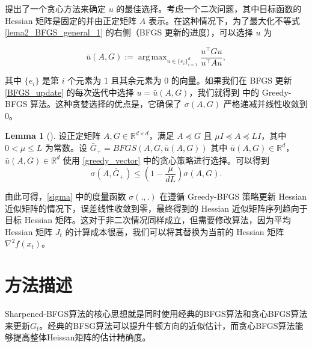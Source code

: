 \documentclass[a4paper,twoside,AutoFakeBold]{article}
\theoremstyle{definition}
\newtheorem{lema2}{{Lemma}}
\DeclareMathOperator*{\argmax}{arg\,max}
\begin{document}
\citet{rodomanov2020greedy} 提出了一个贪心方法来确定 $u$ 的最佳选择。考虑一个二次问题，其中目标函数的 Hessian 矩阵是固定的并由正定矩阵 $A$ 表示。在这种情况下，为了最大化不等式 \eqref{lema2_BFGS_general_1} 的右侧（BFGS 更新的进度），可以选择 $u$ 为

\begin{equation}\label{greedy_vector}
    \bar{u}(A, G) := \argmax_{u \in \{e_i\}_{i = 1}^{d}} \frac{u^\top G u}{u^\top A u},
\end{equation}

其中 $\{e_i\}$ 是第 $i$ 个元素为 $1$ 且其余元素为 $0$ 的向量。如果我们在 BFGS 更新 \eqref{BFGS_update} 的每次迭代中选择 $u = \bar{u}(A, G)$，我们就得到 \cite{rodomanov2020greedy} 中的 Greedy-BFGS 算法。这种贪婪选择的优点是，它确保了 $\sigma(A, G)$ 严格递减并线性收敛到 $0$。

\begin{lema2}[\cite{rodomanov2020greedy}]\label{lema2_BFGS_greedy}
    设正定矩阵 $A, G \in \mathbb{R}^{d \times d}$，满足 $A \preceq G$ 且 $ \mu I \preceq A \preceq LI$，其中 $0 < \mu \leq L$ 为常数。设 $\bar{G}_{+} = BFGS(A, G, \bar{u}(A, G))$ 其中 $\bar{u}(A, G) \in \mathbb{R}^d$，$\bar{u}(A, G) \in \mathbb{R}^d$ 使用 \eqref{greedy_vector} 中的贪心策略进行选择。可以得到
    \begin{equation}\label{lema2_BFGS_greedy_1}
        \sigma(A, \bar{G}_{+}) \leq \left(1 - \frac{\mu}{dL}\right)\sigma(A, G).
    \end{equation}
\end{lema2}

由此可得，\eqref{sigma} 中的度量函数 $\sigma(.,.)$ 在遵循 Greedy-BFGS 策略更新 Hessian 近似矩阵的情况下，误差线性收敛到零，最终得到的 Hessian 近似矩阵序列趋向于目标 Hessian 矩阵。这对于非二次情况同样成立，但需要修改算法，因为平均 Hessian 矩阵 $J_t$ 的计算成本很高，我们可以将其替换为当前的 Hessian 矩阵 $\nabla^2 f(x_t)$。

%
\section{方法描述}\label{section:methods}

Sharpened-BFGS算法的核心思想就是同时使用经典的BFGS算法和贪心BFGS算法来更新$G_t$。经典的BFSG算法可以提升牛顿方向的近似估计，而贪心BFGS算法能够提高整体Heissan矩阵的估计精确度。
\end{document}

